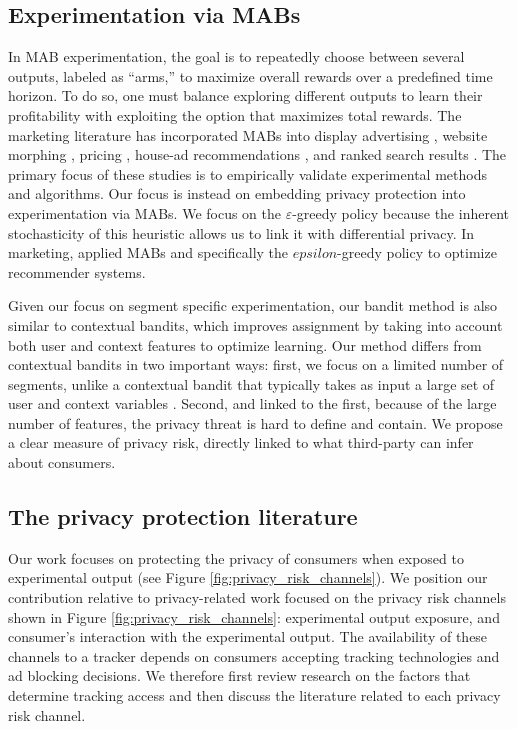 \documentclass[mksc,nonblindrev]{informs3}
\begin{document}
\subsection{Experimentation via MABs}
In MAB experimentation, the goal is to repeatedly choose between several outputs, labeled as ``arms,'' to maximize overall rewards over a predefined time horizon. To do so, one must balance exploring different outputs to learn their profitability with exploiting the option that maximizes total rewards. The marketing literature has incorporated MABs into display advertising \citep{Schwartz_2017}, website morphing \citep{Hauser_2009, hauser2014website, Liberali_2022}, pricing \citep{Misra_2019}, house-ad recommendations \citep{Aramayo_2023}, and ranked search results \citep{delossantos_2017}. The primary focus of these studies is to empirically validate experimental methods and algorithms. Our focus is instead on embedding privacy protection into experimentation via MABs. We focus on the $\varepsilon$-greedy policy because the inherent stochasticity of this heuristic allows us to link it with differential privacy. In marketing, \cite{Wang_2025} applied MABs and specifically the $epsilon$-greedy policy to optimize recommender systems.

Given our focus on segment specific experimentation, our bandit method is also similar to contextual bandits, which improves assignment by taking into account both user and context features to optimize learning. Our method differs from contextual bandits in two important ways: first, we focus on a limited number of segments, unlike a contextual bandit that typically takes as input a large set of user and context variables \citep{li2010contextual}. Second, and linked to the first, because of the large number of features, the privacy threat is hard to define and contain. We propose a clear measure of privacy risk, directly linked to what third-party can infer about consumers.  

\subsection{The privacy protection literature}
Our work focuses on protecting the privacy of consumers when exposed to experimental output (see Figure \ref{fig:privacy_risk_channels}). We position our contribution relative to privacy-related work focused on the privacy risk channels shown in Figure \ref{fig:privacy_risk_channels}: experimental output exposure, and consumer's interaction with the experimental output. The availability of these channels to a tracker depends on consumers accepting tracking technologies and ad blocking decisions. We therefore first review research on the factors that determine tracking access and then discuss the literature related to each privacy risk channel.
\end{document}

